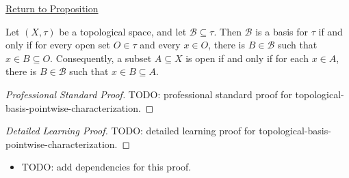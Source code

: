 \newpage
{}
\label{prf:topological-basis-pointwise-characterization}

\begin{remark*}[Return]
\hyperref[prop:topological-basis-pointwise-characterization]{Return to Proposition}
\end{remark*}

\begin{proposition*}
Let \((X,\tau)\) be a topological space, and let
\(\mathcal{B}\subseteq\tau\).  Then \(\mathcal{B}\) is a basis for \(\tau\)
if and only if for every open set \(O\in\tau\) and every \(x\in O\), there is
\(B\in\mathcal{B}\) such that \(x\in B\subseteq O\).  Consequently, a subset
\(A\subseteq X\) is open if and only if for each \(x\in A\), there is
\(B\in\mathcal{B}\) such that \(x\in B\subseteq A\).
\end{proposition*}

\begin{proof}[Professional Standard Proof]
\LRAProofBodyStart
TODO: professional standard proof for topological-basis-pointwise-characterization.
\end{proof}

\begin{proof}[Detailed Learning Proof]
\LRAProofBodyStart
TODO: detailed learning proof for topological-basis-pointwise-characterization.
\end{proof}

\begin{remark*}
\end{remark*}

\begin{dependencies}
\begin{itemize}
  \item TODO: add dependencies for this proof.
\end{itemize}
\end{dependencies}

\clearpage
